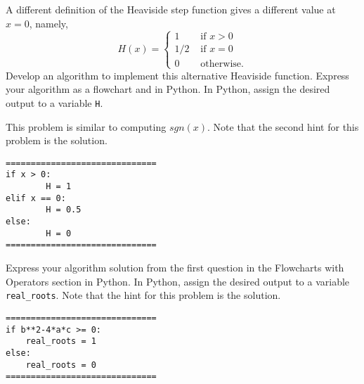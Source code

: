 \documentclass{ximera}
\begin{document}
\begin{question}
A different definition of the Heaviside step function gives a different value at $x=0$, namely,
	$$H(x)=\begin{cases} 1 &\text{ if $x>0$}\\
		1/2 &\text{ if $x=0$}\\
		0 &\text{ otherwise.}
	\end{cases}$$
Develop an algorithm to implement this alternative Heaviside function. Express your algorithm as a flowchart and in Python. In Python, assign the desired output to a variable \verb|H|.
	\begin{hint}
		This problem is similar to computing $sgn(x)$. Note that the second hint for this problem is the solution.
	\end{hint}
	\begin{hint}
	\begin{center}
	\end{center}
\begin{verbatim}
==============================
if x > 0:
        H = 1
elif x == 0:
        H = 0.5
else:
        H = 0
==============================
\end{verbatim}
	\end{hint}
\end{question}

\begin{question}
	Express your algorithm solution from the first question in the Flowcharts with Operators section in Python. In Python, assign the desired output to a variable \verb|real_roots|.  Note that the hint for this problem is the solution.
	\begin{hint}
\begin{verbatim}
==============================
if b**2-4*a*c >= 0:
	real_roots = 1
else:
	real_roots = 0
==============================
\end{verbatim}
	\end{hint}
\end{question}
\end{document}
